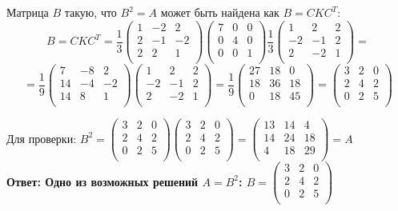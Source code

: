 \documentclass[a4paper,12pt]{article}
\begin{document}
\begin{enumerate}
Матрица $B$ такую, что $B^2 = A$ может быть найдена как $B=C K C^T$:
$$B=C K C^T=\frac{1}{3}\begin{pmatrix}
1&-2&2\\
2&-1&-2\\
2&2&1\\
\end{pmatrix}
\begin{pmatrix}
7&0&0\\
0&4&0\\
0&0&1\\
\end{pmatrix}\frac{1}{3}\begin{pmatrix}
1&2&2\\
-2&-1&2\\
2&-2&1\\
\end{pmatrix}=$$
$$=\frac{1}{9}\begin{pmatrix}
7&-8&2\\
14&-4&-2\\
14&8&1\\
\end{pmatrix}\begin{pmatrix}
1&2&2\\
-2&-1&2\\
2&-2&1\\
\end{pmatrix}=\frac{1}{9}\begin{pmatrix}
27&18&0\\
18&36&18\\
0&18&45\\
\end{pmatrix}=\begin{pmatrix}
3&2&0\\
2&4&2\\
0&2&5\\
\end{pmatrix}$$

Для проверки: $B^2=\begin{pmatrix}
3&2&0\\
2&4&2\\
0&2&5\\
\end{pmatrix}\begin{pmatrix}
3&2&0\\
2&4&2\\
0&2&5\\
\end{pmatrix}=\begin{pmatrix}
{13}&{14}&{4}\\
{14}&{24}&{18}\\
{4}&{18}&{29}\\
\end{pmatrix}=A$\\
\textbf{Ответ: Одно из возможных решений $A=B^2$: $B=\begin{pmatrix}
3&2&0\\
2&4&2\\
0&2&5\\
\end{pmatrix}$}


\end{enumerate}
\end{document}
